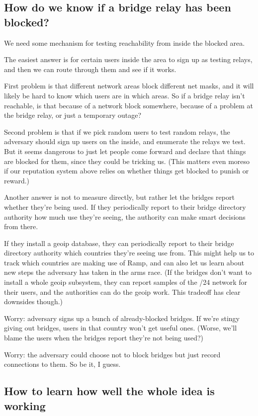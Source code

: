 \documentclass{llncs}
\begin{document}
\subsection{How do we know if a bridge relay has been blocked?}

We need some mechanism for testing reachability from inside the
blocked area.

The easiest answer is for certain users inside the area to sign up as
testing relays, and then we can route through them and see if it works.

First problem is that different network areas block different net masks,
and it will likely be hard to know which users are in which areas. So
if a bridge relay isn't reachable, is that because of a network block
somewhere, because of a problem at the bridge relay, or just a temporary
outage?

Second problem is that if we pick random users to test random relays, the
adversary should sign up users on the inside, and enumerate the relays
we test. But it seems dangerous to just let people come forward and
declare that things are blocked for them, since they could be tricking
us. (This matters even moreso if our reputation system above relies on
whether things get blocked to punish or reward.)

Another answer is not to measure directly, but rather let the bridges
report whether they're being used. If they periodically report to their
bridge directory authority how much use they're seeing, the authority
can make smart decisions from there.

If they install a geoip database, they can periodically report to their
bridge directory authority which countries they're seeing use from. This
might help us to track which countries are making use of Ramp, and can
also let us learn about new steps the adversary has taken in the arms
race. (If the bridges don't want to install a whole geoip subsystem, they
can report samples of the /24 network for their users, and the authorities
can do the geoip work. This tradeoff has clear downsides though.)

Worry: adversary signs up a bunch of already-blocked bridges. If we're
stingy giving out bridges, users in that country won't get useful ones.
(Worse, we'll blame the users when the bridges report they're not
being used?)

Worry: the adversary could choose not to block bridges but just record
connections to them. So be it, I guess.

\subsection{How to learn how well the whole idea is working}
\end{document}
